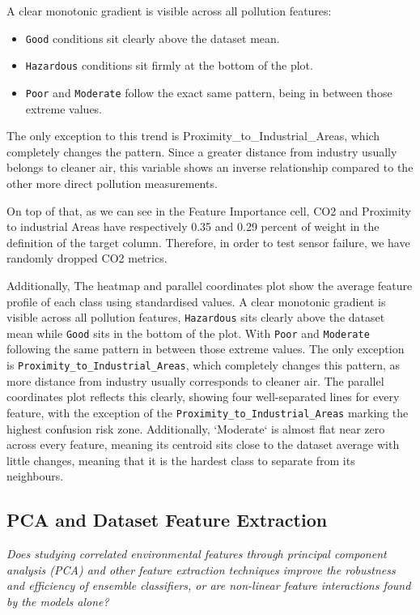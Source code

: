 \documentclass[a4paper,12pt]{article}
\begin{document}
	A clear monotonic gradient is visible across all pollution features:
	\begin{itemize}
		\item \texttt{Good} conditions sit clearly above the dataset mean.
		\item \texttt{Hazardous} conditions sit firmly at the bottom of the plot.
		\item \texttt{Poor} and \texttt{Moderate} follow the exact same pattern, being in between those extreme values.
	\end{itemize}
	
	The only exception to this trend is Proximity\_to\_Industrial\_Areas, which completely changes the pattern. Since a greater distance from industry usually belongs to cleaner air, this variable shows an inverse relationship compared to the other more direct pollution measurements.
	
	On top of that, as we can see in the Feature Importance cell, CO2 and Proximity to industrial Areas have respectively 0.35 and 0.29 percent of weight in the definition of the target column. Therefore, in order to test sensor failure, we have randomly dropped CO2 metrics.
	
	Additionally, The heatmap and parallel coordinates plot show the average feature profile of each class using standardised values. A clear monotonic gradient is visible across all pollution features, \texttt{Hazardous} sits clearly above the dataset mean while \texttt{Good} sits in the bottom of the plot. With \texttt{Poor} and \texttt{Moderate} following the same pattern in between those extreme values. The only exception is \texttt{Proximity\_to\_Industrial\_Areas}, which completely changes this pattern, as more distance from industry usually corresponds to cleaner air. The parallel coordinates plot reflects this clearly, showing four well-separated lines for every feature, with the exception of the \texttt{Proximity\_to\_Industrial\_Areas} marking the highest confusion risk zone. Additionally, `Moderate` is almost flat near zero across every feature, meaning its centroid sits close to the dataset average with little changes, meaning that it is the hardest class to separate from its neighbours.
	
	\subsection{PCA and Dataset Feature Extraction}
	\textit{Does studying correlated environmental features through principal component analysis (PCA) and other feature extraction techniques improve the robustness and efficiency of ensemble classifiers, or are non-linear feature interactions found by the models alone?}
	
\end{document}
